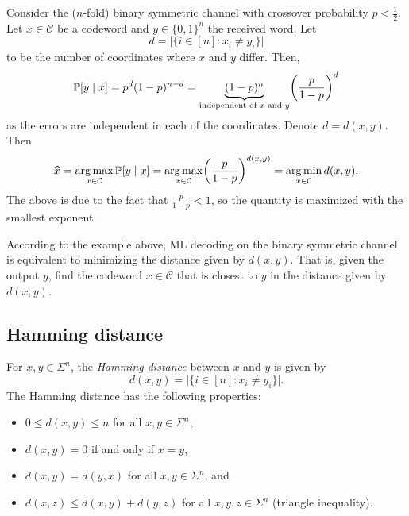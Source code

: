 \documentclass[../main.tex]{subfiles}
\begin{document}
\begin{example}
Consider the ($n$-fold) binary symmetric channel with crossover probability $p < \frac{1}{2}$. Let $x \in \mathcal{C}$ be a codeword and $y \in \{0, 1\}^n$ the received word. Let
\begin{equation*}
    d = \lvert \{i \in [n] \colon x_i \neq y_i \} \rvert
\end{equation*}
to be the number of coordinates where $x$ and $y$ differ. Then,
\begin{equation*}
    \P[y \mid x] = p^d (1 - p)^{n - d} = \underbrace{(1 - p)^n}_{\text{independent of $x$ and $y$}} \left( \frac{p}{1 - p} \right)^d
\end{equation*}
as the errors are independent in each of the coordinates. Denote $d = d(x, y)$. Then
\begin{equation*}
    \hat{x} = \argmax_{x \in \mathcal{C}} \P[y \mid x] = \argmax_{x \in \mathcal{C}} \left( \frac{p}{1 - p} \right)^{d(x, y)} = \argmin_{x \in \mathcal{C}} d(x, y).
\end{equation*}
The above is due to the fact that $\frac{p}{1 - p} < 1$, so the quantity is maximized with the smallest exponent.
\end{example}

According to the example above, ML decoding on the binary symmetric channel is equivalent to minimizing the distance given by $d(x, y)$. That is, given the output $y$, find the codeword $x \in \mathcal{C}$ that is closest to $y$ in the distance given by $d(x, y)$.

\subsection{Hamming distance}

For $x, y \in \Sigma^n$, the \emph{Hamming distance} between $x$ and $y$ is given by
\begin{equation*}
    d(x, y) = \lvert \{ i \in [n] \colon x_i \neq y_i \} \rvert.
\end{equation*}
The Hamming distance has the following properties:
\begin{itemize}
    \item $0 \leq d(x, y) \leq n$ for all $x, y \in \Sigma^n$,
    \item $d(x, y) = 0$ if and only if $x = y$,
    \item $d(x, y) = d(y, x)$ for all $x, y \in \Sigma^n$, and
    \item $d(x, z) \leq d(x, y) + d(y, z)$ for all $x, y, z \in \Sigma^n$ (triangle inequality).
\end{itemize}
\end{document}
